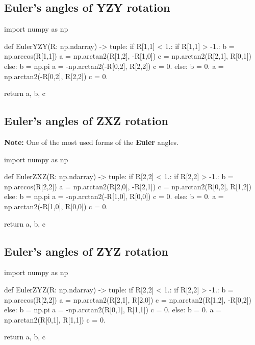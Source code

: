 \subsection{Euler's angles of \textbf{YZY} rotation}

\begin{python}
import numpy as np

def EulerYZY(R: np.ndarray) -> tuple:
    if R[1,1] < 1.:
        if R[1,1] > -1.:
            b = np.arccos(R[1,1])
            a = np.arctan2(R[1,2], -R[1,0])
            c = np.arctan2(R[2,1], R[0,1])
        else:
            b = np.pi
            a = -np.arctan2(-R[0,2], R[2,2])
            c = 0.
    else:
        b = 0.
        a = np.arctan2(-R[0,2], R[2,2])
        c = 0.

    return a, b, c
\end{python}

\subsection{Euler's angles of \textbf{ZXZ} rotation}

        \textbf{Note:} One of the most used forms of the \textbf{Euler} angles.

\begin{python}
import numpy as np

def EulerZXZ(R: np.ndarray) -> tuple:
    if R[2,2] < 1.:
        if R[2,2] > -1.:
            b = np.arccos(R[2,2])
            a = np.arctan2(R[2,0], -R[2,1])
            c = np.arctan2(R[0,2], R[1,2])
        else:
            b = np.pi
            a = -np.arctan2(-R[1,0], R[0,0])
            c = 0.
    else:
        b = 0.
        a = np.arctan2(-R[1,0], R[0,0])
        c = 0.

    return a, b, c
\end{python}

\subsection{Euler's angles of \textbf{ZYZ} rotation}

\begin{python}
import numpy as np

def EulerZYZ(R: np.ndarray) -> tuple:
    if R[2,2] < 1.:
        if R[2,2] > -1.:
            b = np.arccos(R[2,2])
            a = np.arctan2(R[2,1], R[2,0])
            c = np.arctan2(R[1,2], -R[0,2])
        else:
            b = np.pi
            a = -np.arctan2(R[0,1], R[1,1])
            c = 0.
    else:
        b = 0.
        a = np.arctan2(R[0,1], R[1,1])
        c = 0.

    return a, b, c
\end{python}


